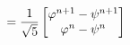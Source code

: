 \documentclass[preview]{standalone}
\begin{document}
\begin{align*}
\special{dvisvgm:raw <g id='unique000'>}= \frac{1}{\sqrt{5}}\begin{bmatrix} \varphi^{n+1} - \psi^{n+1} \\ \varphi^n - \psi^n \end{bmatrix}\special{dvisvgm:raw </g>}
\end{align*}
\end{document}
